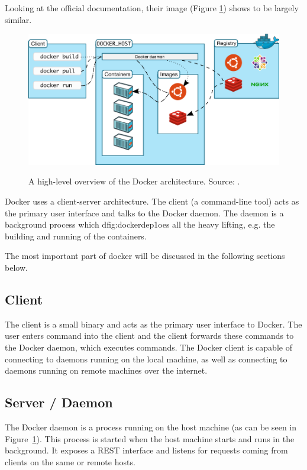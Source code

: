 Looking at the official documentation, their image (Figure \ref{fig:dockerarchipic}) shows to be largely similar.\\

\begin{figure}[H]
\caption{A high-level overview of the Docker architecture. Source: \cite{dockerarchi}.}
\centering
\includegraphics[scale=0.4]{4-softwarearch/images/architecture.png}
\label{fig:dockerarchipic}
\end{figure}
Docker uses a client-server architecture. The client (a command-line tool) acts as the primary user interface and talks to the Docker daemon. The daemon is a background process which dfig:dockerdep1oes all the heavy lifting, e.g. the building and running of the containers.


The most important part of docker will be discussed in the following sections below.

\subsection{Client}
The client is a small binary and acts as the primary user interface to Docker. The user enters command into the client and the client forwards these commands to the Docker daemon, which executes commands.
The Docker client is capable of connecting to daemons running on the local machine, as well as connecting to daemons running on remote machines over the internet.

\subsection{Server / Daemon}
The Docker daemon is a process running on the host machine (as can be seen in Figure~\ref{fig:dockerarchipic}). This process is started when the host machine starts and runs in the background. It exposes a REST interface and listens for requests coming from clients on the same or remote hosts.

